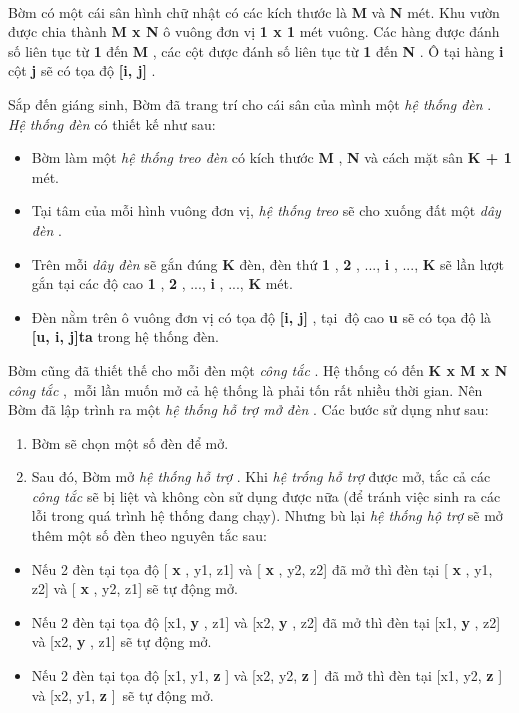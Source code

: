 

 

Bờm có một cái sân hình chữ nhật có các kích thước là \textbf{ M } và \textbf{ N } mét. Khu vườn được chia thành \textbf{ M x N } ô vuông đơn vị \textbf{ 1 x 1 } mét vuông. Các hàng được đánh số liên tục từ \textbf{ 1 } đến \textbf{ M } , các cột được đánh số liên tục từ \textbf{ 1 } đến \textbf{ N } . Ô tại hàng \textbf{ i } cột \textbf{ j } sẽ có tọa độ \textbf{ [i, j] } .

Sắp đến giáng sinh, Bờm đã trang trí cho cái sân của mình một \emph{ hệ thống đèn } . \emph{ Hệ thống đèn } có thiết kế như sau:
\begin{itemize}
	\item Bờm làm một \emph{ hệ thống treo đèn } có kích thước \textbf{ M } , \textbf{ N } và cách mặt sân \textbf{ K + 1 } mét.
	\item Tại tâm của mỗi hình vuông đơn vị, \emph{ hệ thống treo } sẽ cho xuống đất một \emph{ dây đèn } .
	\item Trên mỗi \emph{ dây đèn } sẽ gắn đúng \textbf{ K } đèn, đèn thứ \textbf{ 1 } , \textbf{ 2 } , ..., \textbf{ i } , ..., \textbf{ K } sẽ lần lượt gắn tại các độ cao \textbf{ 1 } , \textbf{ 2 } , ..., \textbf{ i } , ..., \textbf{ K } mét.
	\item Đèn nằm trên ô vuông đơn vị có tọa độ \textbf{ [i, j] } , tại độ cao \textbf{ u } sẽ có tọa độ là \textbf{ [u, i, j]ta } trong hệ thống đèn.
\end{itemize}
\begin{itemize}
\end{itemize}

Bờm cũng đã thiết thế cho mỗi đèn một \emph{ công tắc } . Hệ thống có đến \textbf{ K x M x N }\emph{ công tắc } , mỗi lần muốn mở cả hệ thống là phải tốn rất nhiều thời gian. Nên Bờm đã lập trình ra một \emph{ hệ thống hỗ trợ mở đèn } . Các bước sử dụng như sau:
\begin{enumerate}
	\item Bờm sẽ chọn một số đèn để mở.
	\item Sau đó, Bờm mở \emph{ hệ thống hỗ trợ } . Khi \emph{ hệ trống hỗ trợ } được mở, tắc cả các \emph{ công tắc } sẽ bị liệt và không còn sử dụng được nữa (để tránh việc sinh ra các lỗi trong quá trình hệ thống đang chạy). Nhưng bù lại \emph{ hệ thống hộ trợ } sẽ mở thêm một số đèn theo nguyên tắc sau:
\end{enumerate}
\begin{itemize}
	\item Nếu 2 đèn tại tọa độ [ \textbf{ x } , y1, z1] và [ \textbf{ x } , y2, z2] đã mở thì đèn tại [ \textbf{ x } , y1, z2] và [ \textbf{ x } , y2, z1] sẽ tự động mở.
	\item Nếu 2 đèn tại tọa độ [x1, \textbf{ y } , z1] và [x2, \textbf{ y } , z2] đã mở thì đèn tại [x1, \textbf{ y } , z2] và [x2, \textbf{ y } , z1] sẽ tự động mở.
	\item Nếu 2 đèn tại tọa độ [x1, y1, \textbf{ z } ] \textbf{} và [x2, y2, \textbf{ z } ] đã mở thì đèn tại [x1, y2, \textbf{ z } ] \textbf{} và [x2, y1, \textbf{ z } ] sẽ tự động mở.
\end{itemize}
\begin{itemize}
\end{itemize}

